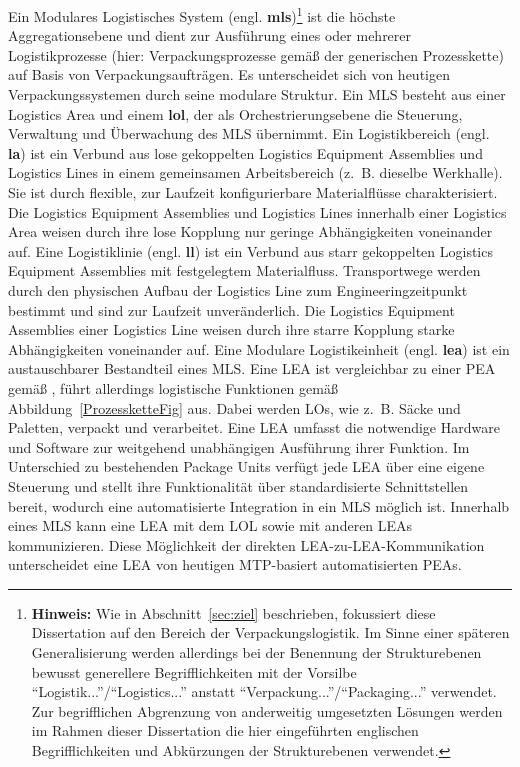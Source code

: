 Ein Modulares Logistisches System (engl. \textbf{\gls{mls}})\footnote{\textbf{Hinweis:} Wie in Abschnitt~\ref{sec:ziel} beschrieben, fokussiert diese Dissertation auf den Bereich der Verpackungslogistik. Im Sinne einer späteren Generalisierung werden allerdings bei der Benennung der Strukturebenen bewusst generellere Begrifflichkeiten mit der Vorsilbe \enquote{Logistik...}/\enquote{Logistics...} anstatt \enquote{Verpackung...}/\enquote{Packaging...} verwendet. \\ Zur begrifflichen Abgrenzung von anderweitig umgesetzten Lösungen werden im Rahmen dieser Dissertation die hier eingeführten englischen Begrifflichkeiten und Abkürzungen der Strukturebenen verwendet.} ist die höchste Aggregationsebene und dient zur Ausführung eines oder mehrerer Logistikprozesse (hier: Verpackungsprozesse gemäß der generischen Prozesskette) auf Basis von Verpackungsaufträgen. Es unterscheidet sich von heutigen Verpackungssystemen durch seine modulare Struktur. Ein MLS besteht aus einer Logistics Area und einem \textbf{\gls{lol}}, der als Orchestrierungsebene die Steuerung, Verwaltung und Überwachung des MLS übernimmt.
Ein Logistikbereich (engl. \textbf{\gls{la}}) ist ein Verbund aus lose gekoppelten Logistics Equipment Assemblies und Logistics Lines in einem gemeinsamen Arbeitsbereich (z.~B. dieselbe Werkhalle). Sie ist durch flexible, zur Laufzeit konfigurierbare Materialflüsse charakterisiert. Die Logistics Equipment Assemblies und Logistics Lines innerhalb einer Logistics Area weisen durch ihre lose Kopplung nur geringe Abhängigkeiten voneinander auf.
Eine Logistiklinie (engl. \textbf{\gls{ll}}) ist ein Verbund aus starr gekoppelten Logistics Equipment Assemblies mit festgelegtem Materialfluss. Transportwege werden durch den physischen Aufbau der Logistics Line zum Engineeringzeitpunkt bestimmt und sind zur Laufzeit unveränderlich. Die Logistics Equipment Assemblies einer Logistics Line weisen durch ihre starre Kopplung starke Abhängigkeiten voneinander auf.
Eine Modulare Logistikeinheit (engl. \textbf{\gls{lea}}) ist ein austauschbarer Bestandteil eines MLS. Eine LEA ist vergleichbar zu einer PEA gemäß \cite{VDI.2020}, führt allerdings logistische Funktionen gemäß Abbildung~\ref{ProzessketteFig} aus. Dabei werden LOs, wie z.~B. Säcke und Paletten, verpackt und verarbeitet. Eine LEA umfasst die notwendige Hardware und Software zur weitgehend unabhängigen Aus\-füh\-rung ihrer Funktion. Im Unterschied zu bestehenden Package Units verfügt jede LEA über eine eigene Steuerung und stellt ihre Funktionalität über standardisierte Schnittstellen bereit, wodurch eine automatisierte Integration in ein MLS möglich ist. Innerhalb eines MLS kann eine LEA mit dem LOL sowie mit anderen LEAs kommunizieren. Diese Möglichkeit der direkten LEA-zu-LEA-Kommunikation unterscheidet eine LEA von heutigen MTP-basiert automatisierten PEAs.
